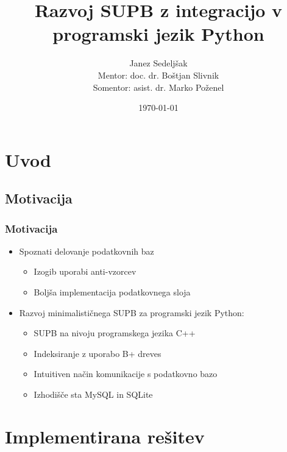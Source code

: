 \documentclass{beamer}
\title{Razvoj SUPB z integracijo v programski jezik Python} %
\author{Janez Sedeljšak
\\ Mentor: doc. dr. Boštjan Slivnik
\\ Somentor: asist. dr. Marko Poženel
} %
\institute[UL FRI] %
{
Univerza v Ljubljani, Fakulteta za računalništvo in informatiko \\ %
\medskip
\textit{js0578@student.uni-lj.si} %
}
\date{\today} %
\begin{document}
\begin{frame}
\titlepage %
\end{frame}


\section{Uvod} %

\subsection{Motivacija}
\begin{frame}
\frametitle{Motivacija}
    \begin{itemize}
        \item{Spoznati delovanje podatkovnih baz}
        \begin{itemize}
            \item{Izogib uporabi anti-vzorcev}
            \item{Boljša implementacija podatkovnega sloja}
        \end{itemize}
    \end{itemize}
    \vfill
    \begin{itemize}
        \item{Razvoj minimalističnega SUPB za programski jezik Python:}
        \begin{itemize}
            \item{SUPB na nivoju programskega jezika C++}
            \item{Indeksiranje z uporabo B+ dreves}
            \item{Intuitiven način komunikacije s podatkovno bazo}
            \item{Izhodišče sta MySQL in SQLite}
        \end{itemize}
    \end{itemize}
\end{frame}

\section{Implementirana rešitev}
\end{document}
